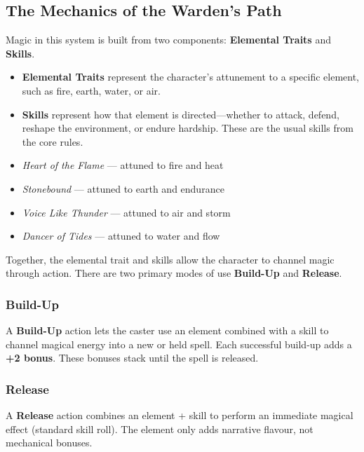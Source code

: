 \subsection{The Mechanics of the Warden’s Path}

Magic in this system is built from two components: \textbf{Elemental Traits} and \textbf{Skills}.

\begin{itemize}
    \item \textbf{Elemental Traits} represent the character’s attunement to a specific element, such as fire, earth, water, or air.
    \item \textbf{Skills} represent how that element is directed—whether to attack, defend, reshape the environment, or endure hardship. These are the usual skills from the core rules.
\end{itemize}

\begin{WyrdExample}
    \begin{itemize}
        \item \textit{Heart of the Flame} — attuned to fire and heat  
        \item \textit{Stonebound} — attuned to earth and endurance  
        \item \textit{Voice Like Thunder} — attuned to air and storm  
        \item \textit{Dancer of Tides} — attuned to water and flow  
    \end{itemize}
\end{WyrdExample}

Together, the elemental trait and skills allow the character to channel magic through action. There are two primary modes of use \textbf{Build-Up} and \textbf{Release}.

\subsubsection{Build-Up}
A \textbf{Build-Up} action lets the caster use an element combined with a skill to channel magical energy into a new or held spell. Each successful build-up adds a \textbf{+2 bonus}. These bonuses stack until the spell is released.


\subsubsection{Release}
A \textbf{Release} action combines an element + skill to perform an immediate magical effect (standard skill roll). The element only adds narrative flavour, not mechanical bonuses.


